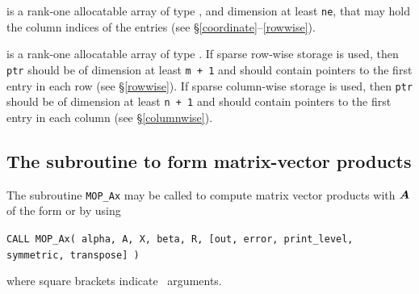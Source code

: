 \documentclass{galahad}
\newcommand{\packagename}{MOP}
\begin{document}
\begin{description}
 is a rank-one allocatable array of type \integer, 
and dimension at least {\tt ne}, that may hold the column indices of the entries
(see \S\ref{coordinate}--\ref{rowwise}).

 is a rank-one allocatable array of type \integer.
If sparse row-wise storage is used, then {\tt ptr} should be of
dimension at least {\tt m + 1} and should contain pointers to the
first entry in each row (see \S\ref{rowwise}). If sparse column-wise
storage is used, then {\tt ptr} should be of dimension at least {\tt n
  + 1} and should contain pointers to the first entry in each column (see
\S\ref{columnwise}).

\end{description}


\subsection{The subroutine to form matrix-vector products}\label{Ax}

The subroutine {\tt \packagename\_Ax} may be called to compute matrix
vector products with ${\bm{A}}$ of the form
or
by using
\vspace*{1mm}

\hspace{8mm}
{\tt CALL \packagename\_Ax( alpha, A, X, beta, R, [out, error,
                            print\_level, symmetric, transpose] )}

\vspace*{1mm}
\noindent where square brackets indicate \optional\ arguments. 
\end{document}
